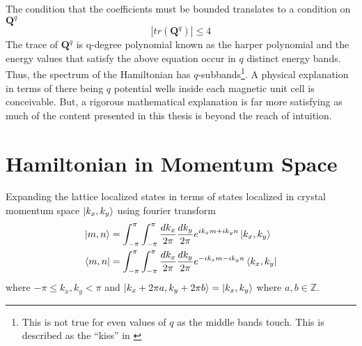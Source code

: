 The condition that the coefficients must be bounded translates to a condition on $\mathbf{Q}^{q}$
\begin{equation}
 |tr(\mathbf{Q}^{q})| \leq 4
\end{equation} The trace of $\mathbf{Q}^{q}$ is q-degree polynomial known as the harper polynomial \cite{hofstadter1976energy, butler1968model,satija2016butterfly} and the energy values
that satisfy the above equation occur in $q$ distinct energy bands. Thus, the spectrum of the Hamiltonian has $q$-subbands\footnote{This is not true for even values of $q$ as the middle bands touch. This is
described as the ``kiss'' in \parencite{hofstadter1976energy,satija2016butterfly}}. A physical explanation in terms of there being $q$ potential wells inside each magnetic unit cell is conceivable. But, a 
rigorous mathematical explanation is far more satisfying as much of the content presented in this thesis is beyond the reach of intuition.

\section{Hamiltonian in Momentum Space}
Expanding the lattice localized states in terms of states localized in crystal momentum space $\ket{k_x, k_y}$ using fourier transform
\begin{align}
 \ket{m, n} &= \int_{-\pi}^{\pi}\int_{-\pi}^{\pi}\frac{dk_{x}}{2\pi}\frac{dk_{y}}{2\pi}e^{ik_xm+ik_yn}\ket{k_x, k_y} \\
 \bra{m, n} &= \int_{-\pi}^{\pi}\int_{-\pi}^{\pi}\frac{dk_{x}}{2\pi}\frac{dk_{y}}{2\pi}e^{-ik_xm-ik_yn}\bra{k_x, k_y}
\end{align} where $-\pi \leq k_x, k_y < \pi$ and $\ket{k_x + 2\pi a, k_y + 2\pi b} = \ket{k_x, k_y}$ where $a, b \in \mathbb{Z}$.

